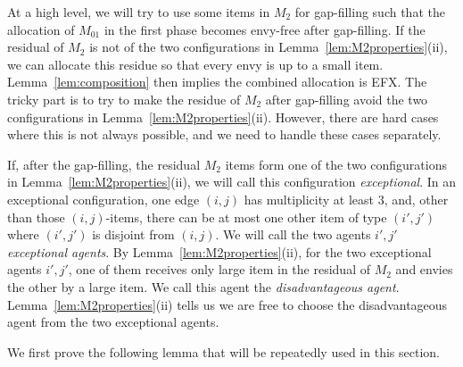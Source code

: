 \documentclass{article}
\theoremstyle{definition}
\begin{document}
At a high level, we will try to use some items in $M_2$ for gap-filling such that the allocation of $M_{01}$ in the first phase becomes envy-free after gap-filling.
If the residual of $M_2$ is not of the two configurations in Lemma~\ref{lem:M2properties}(ii), we can allocate this residue so that every envy is up to a small item.
Lemma~\ref{lem:composition} then implies the combined allocation is EFX.
The tricky part is to try to make the residue of $M_2$ after gap-filling avoid the two configurations in Lemma~\ref{lem:M2properties}(ii).
However, there are hard cases where this is not always possible, and we need to handle these cases separately.

If, after the gap-filling, the residual $M_2$ items form one of the two configurations in Lemma~\ref{lem:M2properties}(ii), we will call this configuration \emph{exceptional}.
In an exceptional configuration, one edge $(i,j)$ has multiplicity at least $3$, and, other than those $(i,j)$-items, there can be at most one other item of type $(i',j')$ where $(i',j')$ is disjoint from $(i,j)$.
We will call the two agents $i',j'$ \emph{exceptional agents}.
By Lemma~\ref{lem:M2properties}(ii), for the two exceptional agents $i',j'$, one of them receives only large item in the residual of $M_2$ and envies the other by a large item.
We call this agent the \emph{disadvantageous agent}.
Lemma~\ref{lem:M2properties}(ii) tells us we are free to choose the disadvantageous agent from the two exceptional agents.

We first prove the following lemma that will be repeatedly used in this section.
\end{document}
